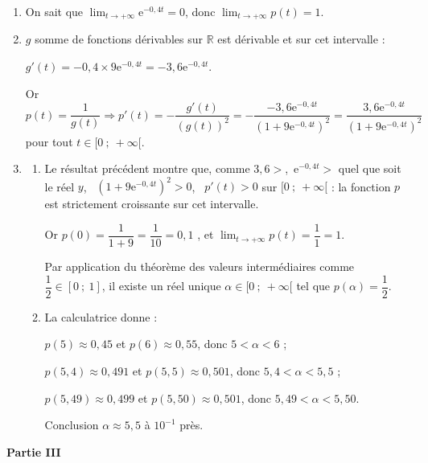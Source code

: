 \documentclass[10pt]{article}
\providecommand{\R}{\mathbb{R}}
\providecommand{\e}{{\mathrm{e}}}
\begin{document}
\begin{enumerate}
\item 
On sait que $\displaystyle\lim_{t \to + \infty} \e^{-0,4t} = 0$, donc $\displaystyle\lim_{t \to + \infty} p(t) = 1$. 
\item 
$g$ somme de fonctions dérivables sur $\R$ est dérivable et sur cet intervalle :

$g'(t) = - 0,4 \times 9\e^{-0,4t} = - 3,6\e^{-0,4t}$.

Or $p(t) = \dfrac{1}{g(t)} \Rightarrow p'(t) = - \dfrac{g'(t)}{(g(t))^2} = - \dfrac{- 3,6\e^{-0,4t}}{\left(1 + 9\e^{-0,4t} \right)^2} = \dfrac{3,6\e^{-0,4t}}{\left(1 + 9\e^{-0,4t} \right)^2}$  pour tout $t \in  [0~;~+ \infty[$.
\item  
	\begin{enumerate}
		\item 
Le résultat précédent montre que, comme $3,6 > $,\, $\e^{-0,4t} > $ quel que soit le réel $y$, \, $\left(1 + 9\e^{-0,4t} \right)^2 > 0$, \, $p'(t) > 0$ sur $[0~;~+ \infty[$ : la fonction $p$ est strictement croissante sur cet intervalle.

Or $p(0) = \dfrac{1}{1 + 9} = \dfrac{1}{10} = 0,1$ ,  et $\displaystyle\lim_{t \to + \infty} p(t) = \dfrac{1}{1} = 1$.

Par application du théorème des valeurs intermédiaires comme $\dfrac{1}{2} \in [0~;~1]$, il existe un réel unique $\alpha \in [0~;~+ \infty[$ tel que $p(\alpha) = \dfrac{1}{2}$.
		\item 
La calculatrice donne :

$p(5) \approx 0,45$ et $p(6) \approx 0,55$, donc $5 < \alpha < 6$ ;

$p(5,4) \approx 0,491$ et $p(5,5) \approx 0,501$, donc $5,4 < \alpha < 5,5$ ;

$p(5,49) \approx 0,499$ et $p(5,50) \approx 0,501$, donc $5,49 < \alpha < 5,50$.

Conclusion $\alpha \approx 5,5$ à $10^{-1}$ près.
	\end{enumerate}
\end{enumerate}

\bigskip

\textbf{Partie III}

\medskip
\end{document}
